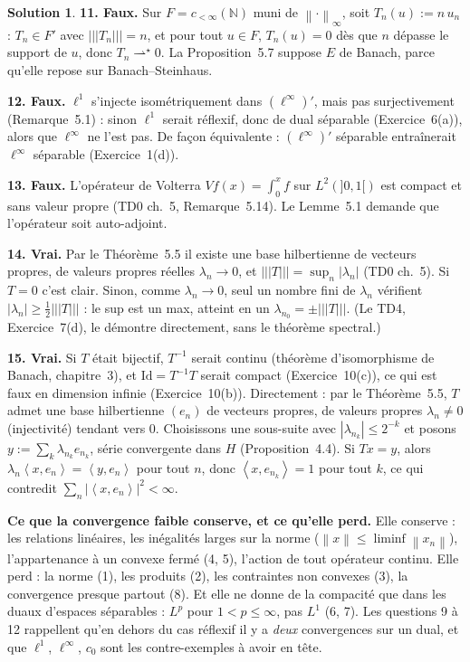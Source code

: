 \documentclass[11pt,a4paper]{article}
\newcommand{\N}{\mathbb{N}}
\newcommand{\norm}[1]{\left\|#1\right\|}
\newcommand{\opnorm}[1]{|\!|\!|#1|\!|\!|}
\newcommand{\ps}[2]{\left\langle #1,#2\right\rangle}
\newcommand{\wks}{\rightharpoonup^{\!\star}}
\theoremstyle{definition}
\newtheorem*{solution}{Solution}
\begin{document}
\begin{solution}
\medskip
\noindent\textbf{11. Faux.} Sur $F=c_{<\infty}(\N)$ muni de $\norm\cdot_\infty$, soit $T_n(u):=n\,u_n$ : $T_n\in F'$ avec $\opnorm{T_n}=n$, et pour tout $u\in F$, $T_n(u)=0$ dès que $n$ dépasse le support de $u$, donc $T_n\wks0$. La Proposition~5.7 suppose $E$ de Banach, parce qu'elle repose sur Banach--Steinhaus.

\medskip
\noindent\textbf{12. Faux.} $\ell^1$ s'injecte isométriquement dans $(\ell^\infty)'$, mais pas surjectivement (Remarque~5.1) : sinon $\ell^1$ serait réflexif, donc de dual séparable (Exercice~6(a)), alors que $\ell^\infty$ ne l'est pas. De façon équivalente : $(\ell^\infty)'$ séparable entraînerait $\ell^\infty$ séparable (Exercice~1(d)).

\medskip
\noindent\textbf{13. Faux.} L'opérateur de Volterra $Vf(x)=\int_0^xf$ sur $L^2(]0,1[)$ est compact et sans valeur propre (TD0 ch.~5, Remarque~5.14). Le Lemme~5.1 demande que l'opérateur soit auto-adjoint.

\medskip
\noindent\textbf{14. Vrai.} Par le Théorème~5.5 il existe une base hilbertienne de vecteurs propres, de valeurs propres réelles $\lambda_n\to0$, et $\opnorm T=\sup_n|\lambda_n|$ (TD0 ch.~5). Si $T=0$ c'est clair. Sinon, comme $\lambda_n\to0$, seul un nombre fini de $\lambda_n$ vérifient $|\lambda_n|\ge\frac12\opnorm T$ : le sup est un max, atteint en un $\lambda_{n_0}=\pm\opnorm T$. (Le TD4, Exercice~7(d), le démontre directement, sans le théorème spectral.)

\medskip
\noindent\textbf{15. Vrai.} Si $T$ était bijectif, $T^{-1}$ serait continu (théorème d'isomorphisme de Banach, chapitre~3), et $\mathrm{Id}=T^{-1}T$ serait compact (Exercice~10(c)), ce qui est faux en dimension infinie (Exercice~10(b)). Directement : par le Théorème~5.5, $T$ admet une base hilbertienne $(e_n)$ de vecteurs propres, de valeurs propres $\lambda_n\ne0$ (injectivité) tendant vers $0$. Choisissons une sous-suite avec $|\lambda_{n_k}|\le2^{-k}$ et posons $y:=\sum_k\lambda_{n_k}e_{n_k}$, série convergente dans $H$ (Proposition~4.4). Si $Tx=y$, alors $\lambda_n\ps x{e_n}=\ps y{e_n}$ pour tout $n$, donc $\ps x{e_{n_k}}=1$ pour tout $k$, ce qui contredit $\sum_n|\ps x{e_n}|^2<\infty$.
\end{solution}

\begin{piege}
\textbf{Ce que la convergence faible conserve, et ce qu'elle perd.} Elle conserve : les relations linéaires, les inégalités larges sur la norme ($\norm x\le\liminf\norm{x_n}$), l'appartenance à un convexe fermé (4, 5), l'action de tout opérateur continu. Elle perd : la norme (1), les produits (2), les contraintes non convexes (3), la convergence presque partout (8). Et elle ne donne de la compacité que dans les duaux d'espaces séparables : $L^p$ pour $1<p\le\infty$, pas $L^1$ (6, 7). Les questions 9 à 12 rappellent qu'en dehors du cas réflexif il y a \emph{deux} convergences sur un dual, et que $\ell^1$, $\ell^\infty$, $c_0$ sont les contre-exemples à avoir en tête.
\end{piege}
\end{document}
